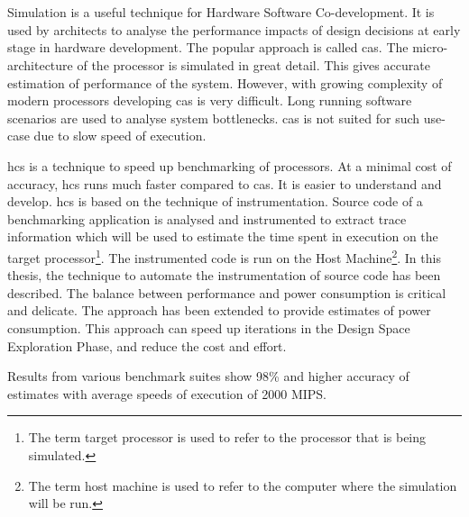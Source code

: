 \chapter{\abstractname}

Simulation is a useful technique for Hardware Software Co-development. It is used by architects to analyse the performance impacts of design decisions at early stage in hardware development. The popular approach is called \gls{cas}. The micro-architecture of the processor is simulated in great detail. This gives accurate estimation of performance of the system. However, with growing complexity of modern processors developing \gls{cas} is very difficult. Long running software scenarios are used to analyse system bottlenecks. \gls{cas} is not suited for such use-case due to slow speed of execution.

\gls{hcs} is a technique to speed up benchmarking of processors. At a minimal cost of accuracy, \gls{hcs} runs much faster compared to \gls{cas}. It is easier to understand and develop. \gls{hcs} is based on the technique of instrumentation. Source code of a benchmarking application is analysed and instrumented to extract trace information which will be used to estimate the time spent in execution on the target processor\footnote{The term target processor is used to refer to the processor that is being simulated.}. The instrumented code is run on the Host Machine\footnote{The term host machine is used to refer to the computer where the simulation will be run.}. In this thesis, the technique to automate the instrumentation of source code has been described. The balance between performance and power consumption is critical and delicate. The approach has been extended to provide estimates of power consumption. This approach can speed up iterations in the Design Space Exploration Phase, and reduce the cost and effort.

Results from various benchmark suites show 98\% and higher accuracy of estimates with average speeds of execution of 2000 MIPS. 

